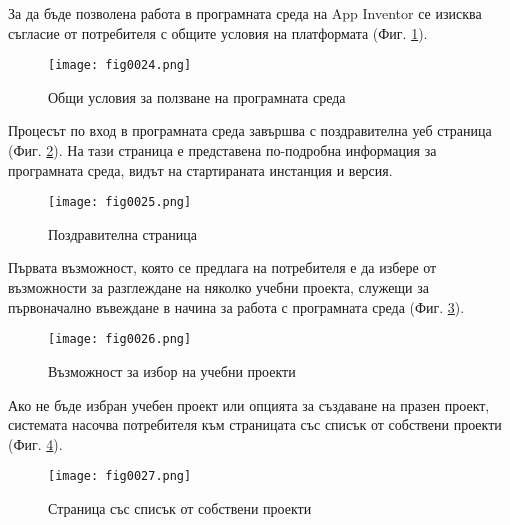 За да бъде позволена работа в програмната среда на App Inventor се изисква съгласие от потребителя с общите условия на платформата (Фиг. \ref{fig0024}).

\begin{figure}[H]
  \centering
  \texttt{[image: fig0024.png]}
  \caption{Общи условия за ползване на програмната среда}
\label{fig0024}
\end{figure}

Процесът по вход в програмната среда завършва с поздравителна уеб страница (Фиг. \ref{fig0025}). На тази страница е представена по-подробна информация за програмната среда, видът на стартираната инстанция и версия. 

\begin{figure}[H]
  \centering
  \texttt{[image: fig0025.png]}
  \caption{Поздравителна страница}
\label{fig0025}
\end{figure}

Първата възможност, която се предлага на потребителя е да избере от възможности за разглеждане на няколко учебни проекта, служещи за първоначално въвеждане в начина за работа с програмната среда (Фиг. \ref{fig0026}).

\begin{figure}[H]
  \centering
  \texttt{[image: fig0026.png]}
  \caption{Възможност за избор на учебни проекти}
\label{fig0026}
\end{figure}

Ако не бъде избран учебен проект или опцията за създаване на празен проект, системата насочва потребителя към страницата със списък от собствени проекти (Фиг. \ref{fig0027}).

\begin{figure}[H]
  \centering
  \texttt{[image: fig0027.png]}
  \caption{Страница със списък от собствени проекти}
\label{fig0027}
\end{figure}

